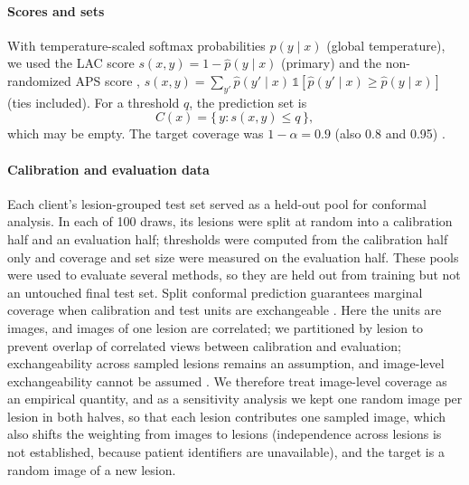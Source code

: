\paragraph{Scores and sets} With temperature-scaled softmax probabilities $\hat p(y\mid x)$ (global
temperature), we used the LAC score $s(x,y)=1-\hat p(y\mid x)$ \cite{sadinle2019lac} (primary) and the
non-randomized APS score \cite{romano2020aps}, $s(x,y)=\sum_{y'}\hat p(y'\mid x)\,\mathbb{1}[\hat
p(y'\mid x)\ge \hat p(y\mid x)]$ (ties included). For a threshold $q$, the prediction set is
\begin{equation}
  C(x)=\{\,y: s(x,y)\le q\,\},
  \label{eq:set}
\end{equation}
which may be empty. The target coverage was $1-\alpha=0.9$ (also 0.8 and 0.95)
\cite{angelopoulos2023gentle}.

\paragraph{Calibration and evaluation data} Each client's lesion-grouped test set served as a held-out
pool for conformal analysis. In each of 100 draws, its lesions were split at random into a calibration
half and an evaluation half; thresholds were computed from the calibration half only and coverage and set
size were measured on the evaluation half. These pools were used to evaluate several methods, so they are
held out from training but not an untouched final test set. Split conformal prediction guarantees
marginal coverage when calibration and test units are exchangeable
\cite{vovk2005algorithmic,angelopoulos2023gentle}. Here the units are images, and images of one lesion are
correlated; we partitioned by lesion to prevent overlap of correlated views between calibration and evaluation; exchangeability across sampled lesions remains an assumption, and image-level exchangeability cannot be assumed \cite{lee2023hierarchical,dunn2022hierarchical}. We therefore treat image-level coverage as an
empirical quantity, and as a sensitivity analysis we kept one random image per lesion in both halves, so
that each lesion contributes one sampled image, which also shifts the weighting from images to lesions (independence across lesions is not established, because patient identifiers are unavailable), and the target is a random image of a new
lesion.

